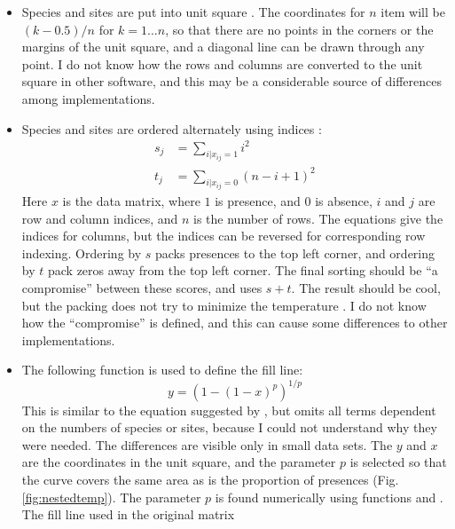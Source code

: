 \documentclass[article,nojss]{jss}
\begin{document}
\begin{itemize}
\item Species and sites are put into unit square \citep{RodGir06}. The
  coordinates for $n$ item will be $(k-0.5)/n$ for $k=1 \ldots n$, so
  that there are no points in the corners or the margins of the unit
  square, and a diagonal line can be drawn through any point. I do not
  know how the rows and columns are converted to the unit square in
  other software, and this may be a considerable source of differences
  among implementations.
  \item Species and sites are ordered alternately using indices
    \citep{RodGir06}:
    \begin{equation}
    \begin{split}
      s_j &= \sum_{i|x_{ij} = 1} i^2 \\
      t_j &= \sum_{i|x_{ij} = 0} (n-i+1)^2 
    \end{split}
    \end{equation}
    Here $x$ is the data matrix, where $1$ is presence, and $0$ is
    absence, $i$ and $j$ are row and column indices, and $n$ is the
    number of rows. The equations give the indices for columns, but
    the indices can be reversed for corresponding row indexing.
    Ordering by $s$ packs presences to the top left corner, and
    ordering by $t$ pack zeros away from the top left corner. The final
    sorting should be ``a compromise'' \citep{RodGir06} between these
    scores, and  uses $s+t$.  The result should be cool,
    but the packing does not try to minimize the temperature
    \citep{RodGir06}.  I do not know how the ``compromise'' is
    defined, and this can cause some differences to other
    implementations.
  \item The following function is used to define the fill line:
    \begin{equation}
      y = (1-(1-x)^p)^{1/p}
    \end{equation}
    This is similar to the equation suggested by
    \citet[eq. 4]{RodGir06}, but omits all terms dependent on the
    numbers of species or sites, because I could not understand why
    they were needed. The differences are visible only in small data
    sets. The $y$ and $x$ are the coordinates in the unit square, and
    the parameter $p$ is selected so that the curve covers the same
    area as is the proportion of presences
    (Fig. \ref{fig:nestedtemp}). The parameter $p$ is found
    numerically using  functions  and
    .  The fill line used in the original matrix

\end{itemize}
\end{document}
